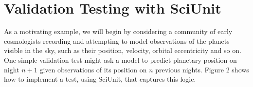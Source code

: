 \documentclass[9pt]{sig-alternate}
\begin{document}
\section{Validation Testing with {SciUnit}}

As a motivating example, we will begin by considering a community of early cosmologists recording and attempting to model observations of the planets visible in the sky, such as their position, velocity, orbital eccentricity and so on. One simple validation test might ask a model to predict planetary position on night $n+1$ given observations of its position on $n$ previous nights. Figure 2 shows how to implement a test, using  SciUnit, that captures this logic.
\end{document}

